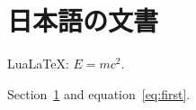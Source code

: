\documentclass{ltjsarticle}
\newcommand{\energy}{E=mc^2}
\begin{document}
\section{日本語の文書}\label{sec:first}
LuaLaTeX: $\energy$.

\newpage
Section~\ref{sec:first} and equation~\ref{eq:first}.
\end{document}
